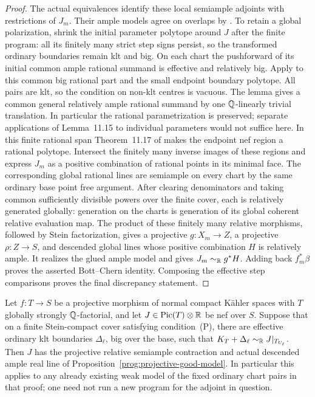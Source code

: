 \begin{proof}
The actual equivalences identify these local semiample adjoints
with restrictions of \(J_m\). Their ample models agree on overlaps
by \cite[Lemma~11.3]{FujinoAnalyticBCHM}. To retain a global
polarization, shrink the initial parameter polytope around \(J\)
after the finite program: all its finitely many strict step signs
persist, so the transformed ordinary boundaries remain klt and big.
On each chart the pushforward of its initial common ample rational
summand is effective and relatively big. Apply
\cite[Lemma~11.13]{FujinoAnalyticBCHM} to this common big rational
part and the small endpoint boundary polytope. All pairs are klt,
so the condition on non-klt centres is vacuous. The lemma gives a
common general relatively ample rational summand by one
\(\mathbb Q\)-linearly trivial translation. In particular the rational
parametrization is preserved; separate applications of
Lemma~11.15 to individual parameters would not suffice here.
In this finite rational span Theorem~11.17 of \cite{FujinoAnalyticBCHM}
makes the endpoint nef region a rational polytope. Intersect the
finitely many inverse images of these regions and express \(J_m\)
as a positive combination of rational points in its minimal face.
The corresponding global rational lines are semiample on every
chart by the same ordinary base point free argument. After clearing
denominators and taking common sufficiently divisible powers over
the finite cover, each is relatively generated globally: generation on
the charts is generation of its global coherent relative
evaluation map. The product of these finitely many relative
morphisms, followed by Stein factorization, gives a projective
\(g:X_m\to Z\), a projective \(\rho:Z\to S\), and descended
global lines whose positive combination \(H\) is relatively ample.
It realizes the glued ample model and gives
\(J_m\sim_{\mathbb R}g^*H\). Adding back \(f_m^*\beta\) proves the
asserted Bott--Chern identity. Composing the effective step
comparisons proves the final discrepancy statement.
\end{proof}

\begin{corollary}
\label{prog:projective-semiample}
Let \(f:T\to S\) be a projective morphism of normal compact Kähler
spaces with \(T\) globally strongly \(\mathbb Q\)-factorial, and let
\(J\in\operatorname{Pic}(T)\otimes\mathbb R\) be nef over \(S\). Suppose that on a
finite Stein-compact cover satisfying condition~(P), there are
effective ordinary klt boundaries \(\Delta_\ell\), big over the
base, such that
\(K_T+\Delta_\ell\sim_{\mathbb R}J|_{T_{U_\ell}}\).
Then \(J\) has the projective relative semiample contraction and
actual descended ample real line of
Proposition~\ref{prog:projective-good-model}.
In particular this applies to any already existing weak model of
the fixed ordinary chart pairs in that proof; one need not run a
new program for the adjoint in question.
\end{corollary}

